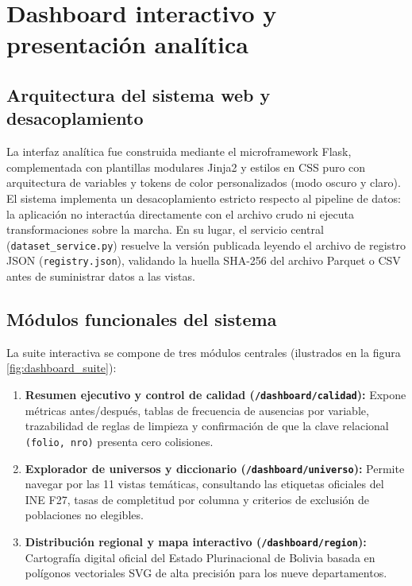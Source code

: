\section{Dashboard interactivo y presentación analítica}

\subsection{Arquitectura del sistema web y desacoplamiento}
La interfaz analítica fue construida mediante el microframework Flask, complementada con plantillas modulares Jinja2 y estilos en CSS puro con arquitectura de variables y tokens de color personalizados (modo oscuro y claro). El sistema implementa un desacoplamiento estricto respecto al pipeline de datos: la aplicación no interactúa directamente con el archivo crudo ni ejecuta transformaciones sobre la marcha. En su lugar, el servicio central (\texttt{dataset\_service.py}) resuelve la versión publicada leyendo el archivo de registro JSON (\texttt{registry.json}), validando la huella SHA-256 del archivo Parquet o CSV antes de suministrar datos a las vistas.

\subsection{Módulos funcionales del sistema}
La suite interactiva se compone de tres módulos centrales (ilustrados en la figura \ref{fig:dashboard_suite}):

\begin{enumerate}[leftmargin=0.5in]
  \item \textbf{Resumen ejecutivo y control de calidad (\texttt{/dashboard/calidad}):} Expone métricas antes/después, tablas de frecuencia de ausencias por variable, trazabilidad de reglas de limpieza y confirmación de que la clave relacional \texttt{(folio, nro)} presenta cero colisiones.
  \item \textbf{Explorador de universos y diccionario (\texttt{/dashboard/universo}):} Permite navegar por las 11 vistas temáticas, consultando las etiquetas oficiales del INE F27, tasas de completitud por columna y criterios de exclusión de poblaciones no elegibles.
  \item \textbf{Distribución regional y mapa interactivo (\texttt{/dashboard/region}):} Cartografía digital oficial del Estado Plurinacional de Bolivia basada en polígonos vectoriales SVG de alta precisión para los nueve departamentos.
\end{enumerate}

